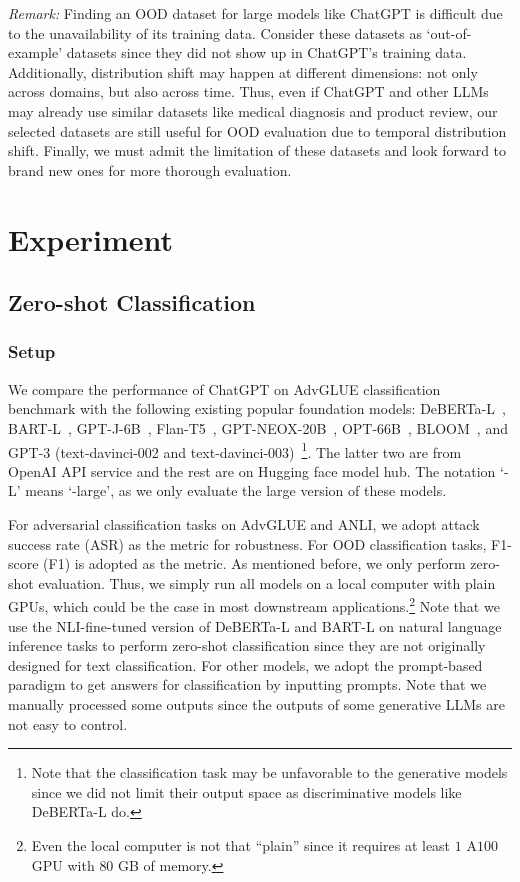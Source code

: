 \documentclass[11pt]{article}
\newcommand{\chat}{ChatGPT\xspace}
\newcommand{\advglue}{AdvGLUE\xspace}
\begin{document}
\emph{Remark:}
Finding an OOD dataset for large models like \chat is difficult due to the unavailability of its training data.
Consider these datasets as `out-of-example' datasets since they did not show up in \chat's training data.
Additionally, distribution shift may happen at different dimensions: not only across domains, but also across time.
Thus, even if \chat and other LLMs may already use similar datasets like medical diagnosis and product review, our selected datasets are still useful for OOD evaluation due to temporal distribution shift.
Finally, we must admit the limitation of these datasets and look forward to brand new ones for more thorough evaluation.


\section{Experiment}

\subsection{Zero-shot Classification}

\subsubsection{Setup}

We compare the performance of \chat on AdvGLUE classification benchmark with the following existing popular foundation models:
DeBERTa-L~\cite{he2020deberta}, BART-L~\cite{lewis2020bart}, GPT-J-6B~\cite{gpt-j},
Flan-T5~\cite{raffel2020exploring,chung2022scaling}, 
GPT-NEOX-20B~\cite{neox20b},
OPT-66B~\cite{zhang2022opt}, 
BLOOM~\cite{scao2022bloom}, and GPT-3 (text-davinci-002 and text-davinci-003)~\footnote{Note that the classification task may be unfavorable to the generative models since we did not limit their output space as discriminative models like DeBERTa-L do.}.
The latter two are from OpenAI API service and the rest are on Hugging face model hub.
The notation `-L' means `-large', as we only evaluate the large version of these models.


For adversarial classification tasks on \advglue and ANLI, we adopt attack success rate (ASR) as the metric for robustness.
For OOD classification tasks, F1-score (F1) is adopted as the metric.
As mentioned before, we only perform zero-shot evaluation.
Thus, we simply run all models on a local computer with plain GPUs, which could be the case in most downstream applications.\footnote{Even the local computer is not that ``plain'' since it requires at least $1$ A$100$ GPU with $80$ GB of memory.}
Note that we use the NLI-fine-tuned version of DeBERTa-L and BART-L on natural language inference tasks to perform zero-shot classification since they are not originally designed for text classification.
For other models, we adopt the prompt-based paradigm to get answers for classification by inputting prompts.
Note that we manually processed some outputs since the outputs of some generative LLMs are not easy to control.
\end{document}
